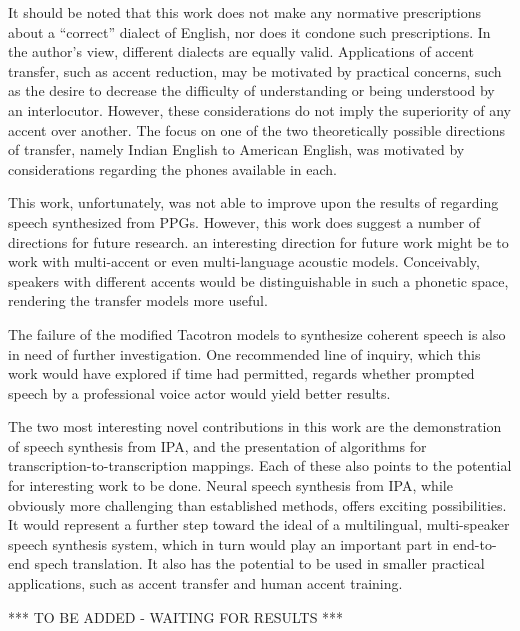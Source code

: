 %

It should be noted that this work does not make any normative prescriptions about a ``correct'' dialect of English,
nor does it condone such prescriptions. In the author's view, different dialects are equally valid.
Applications of accent transfer, such as accent reduction, may be motivated by practical concerns, such as the desire to decrease the difficulty 
of understanding or being understood by an interlocutor. However, these considerations do not imply the superiority 
of any accent over another. The focus on one of the two theoretically possible directions of transfer, 
namely Indian English to American English, was motivated by considerations regarding the phones available in each.

This work, unfortunately, was not able to improve upon the results of \cite{facviappg} regarding speech synthesized 
from PPGs. However, this work does suggest a number of directions for future research.  an interesting direction for future work might be to work with multi-accent or even 
multi-language acoustic models. Conceivably, speakers with different accents would be distinguishable in such a phonetic space, rendering the transfer models 
more useful.

The failure of the modified Tacotron models to synthesize coherent speech is also in need of further investigation. 
One recommended line of inquiry, which this work would have explored if time had permitted, regards whether 
prompted speech by a professional voice actor would yield better results.

The two most interesting novel contributions in this work are the demonstration of speech synthesis from 
IPA, and the presentation of algorithms for transcription-to-transcription mappings. 
Each of these also points to the potential for interesting work to be done. Neural speech synthesis from IPA, 
while obviously more challenging than established methods, offers exciting possibilities. 
It would represent a further step toward the ideal of a multilingual, multi-speaker speech synthesis system, which 
in turn would play an important part in end-to-end spech translation.
It also has the potential to be used in smaller practical applications, such as accent transfer and 
human accent training.


*** TO BE ADDED - WAITING FOR RESULTS ***

